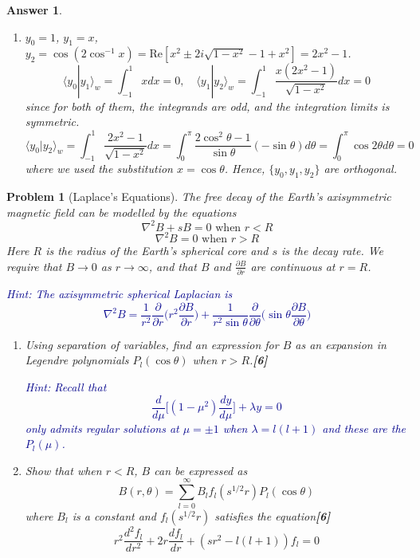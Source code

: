 \documentclass[a4paper]{article}
\newtheorem{ans}{Answer}[section]
\theoremstyle{new}
\newtheorem{qns}{Problem}[section]
\begin{document}
\begin{ans}
\begin{enumerate}[label=(\alph*)]
\begin{enumerate}[label=(\alph*)]
\item $y_0=1$, $y_1=x$, $y_2=\cos(2\cos^{-1}x)=\text{Re}[x^2\pm 2i\sqrt{1-x^2}-1+x^2]=2x^2-1$. 
$$\langle y_0|y_1\rangle_w=\int_{-1}^1xdx=0,\quad\langle y_1|y_2\rangle_w=\int_{-1}^1\frac{x(2x^2-1)}{\sqrt{1-x^2}}dx=0$$
since for both of them, the integrands are odd, and the integration limits is symmetric. 
$$\langle y_0|y_2\rangle_w=\int_{-1}^1\frac{2x^2-1}{\sqrt{1-x^2}}dx=\int_0^\pi\frac{2\cos^2\theta-1}{\sin\theta}(-\sin\theta)d\theta=\int_0^\pi\cos2\theta d\theta=0$$
where we used the substitution $x=\cos\theta$. Hence, $\{y_0,y_1,y_2\}$ are orthogonal.
\end{enumerate}
\end{enumerate}
\end{ans}
\begin{qns}[Laplace's Equations]
The free decay of the Earth’s axisymmetric magnetic field can be modelled by the equations
$$\nabla^2B+sB=0\text{ when }r<R$$
$$\nabla^2B=0\text{   when }r>R$$
Here $R$ is the radius of the Earth’s spherical core and $s$ is the decay rate. We require that $B\rightarrow0$ as $r\rightarrow\infty$, and that $B$ and $\frac{\partial B}{\partial r}$ are continuous at $r = R$.

\begin{mdframed}
\textcolor{darkblue}{Hint: The axisymmetric spherical Laplacian is
$$\nabla^2B=\frac{1}{r^2}\frac{\partial}{\partial r}\bigg(r^2\frac{\partial B}{\partial r}\bigg)+\frac{1}{r^2\sin\theta}\frac{\partial}{\partial\theta}\bigg(\sin\theta\frac{\partial B}{\partial\theta}\bigg)$$}
\end{mdframed}
\begin{enumerate}[label=(\roman*)]
\item Using separation of variables, find an expression for $B$ as an expansion in Legendre polynomials $P_l(\cos\theta)$ when $r > R$.\hfill\textbf{[6]}
\begin{mdframed}
\textcolor{darkblue}{Hint: Recall that
$$\frac{d}{d\mu}\bigg[(1-\mu^2)\frac{dy}{d\mu}\bigg]+\lambda y=0$$
only admits regular solutions at $\mu=\pm1$ when $\lambda=l(l+1)$ and these are the $P_l(\mu)$.}
\end{mdframed}
\item Show that when $r < R$, $B$ can be expressed as
$$B(r,\theta)=\sum_{l=0}^\infty B_lf_l(s^{1/2}r)P_l(\cos\theta)$$
where $B_l$ is a constant and $f_l(s^{1/2} r)$ satisfies the equation\hfill\textbf{[6]}
$$r^2\frac{d^2f_l}{dr^2}+2r\frac{df_l}{dr}+(sr^2-l(l+1))f_l=0$$


\end{enumerate}
\end{qns}
\end{document}
